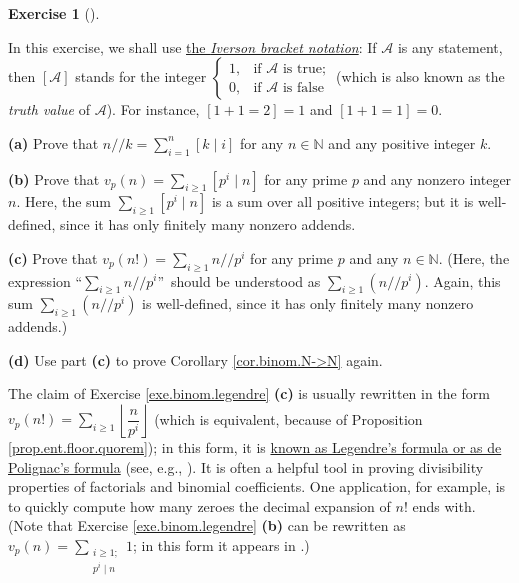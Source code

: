 \documentclass[numbers=enddot,12pt,final,onecolumn,notitlepage]{scrartcl}%
\newcounter{exer}
\numberwithin{exer}{subsection}
\theoremstyle{definition}
\newtheorem{exmp}[exer]{Exercise}
\newenvironment{exercise}[1][]
{\begin{exmp}[#1]\begin{leftbar}}
{\end{leftbar}\end{exmp}}
\let\sumnonlimits\sum
\renewcommand{\sum}{\sumnonlimits\limits}
\begin{document}
\begin{exercise}
\label{exe.binom.legendre}In this exercise, we shall use
\href{https://en.wikipedia.org/wiki/Iverson_bracket}{the \textit{Iverson
bracket notation}}: If $\mathcal{A}$ is any statement, then $\left[
\mathcal{A}\right]  $ stands for the integer $%
\begin{cases}
1, & \text{if $\mathcal{A}$ is true;}\\
0, & \text{if $\mathcal{A}$ is false}%
\end{cases}
$ (which is also known as the \textit{truth value} of $\mathcal{A}$). For
instance, $\left[  1+1=2\right]  =1$ and $\left[  1+1=1\right]  =0$.

\textbf{(a)} Prove that $n//k=\sum_{i=1}^{n}\left[  k\mid i\right]  $ for any
$n\in\mathbb{N}$ and any positive integer $k$.

\textbf{(b)} Prove that $v_{p}\left(  n\right)  =\sum_{i\geq1}\left[
p^{i}\mid n\right]  $ for any prime $p$ and any nonzero integer $n$. Here, the
sum $\sum_{i\geq1}\left[  p^{i}\mid n\right]  $ is a sum over all positive
integers; but it is well-defined, since it has only finitely many nonzero addends.

\textbf{(c)} Prove that $v_{p}\left(  n!\right)  =\sum_{i\geq1}n//p^{i}$ for
any prime $p$ and any $n\in\mathbb{N}$. (Here, the expression
\textquotedblleft$\sum_{i\geq1}n//p^{i}$\textquotedblright\ should be
understood as $\sum_{i\geq1}\left(  n//p^{i}\right)  $. Again, this sum
$\sum_{i\geq1}\left(  n//p^{i}\right)  $ is well-defined, since it has only
finitely many nonzero addends.)

\textbf{(d)} Use part \textbf{(c)} to prove Corollary \ref{cor.binom.N->N} again.
\end{exercise}

The claim of Exercise \ref{exe.binom.legendre} \textbf{(c)} is usually
rewritten in the form $v_{p}\left(  n!\right)  =\sum_{i\geq1}\left\lfloor
\dfrac{n}{p^{i}}\right\rfloor $ (which is equivalent, because of Proposition
\ref{prop.ent.floor.quorem}); in this form, it is
\href{https://en.wikipedia.org/wiki/Legendre's_formula}{known as Legendre's
formula or as de Polignac's formula} (see, e.g., \cite[Theorem 1.3.3]{floor}).
It is often a helpful tool in proving divisibility properties of factorials
and binomial coefficients. One application, for example, is to quickly compute
how many zeroes the decimal expansion of $n!$ ends with. (Note that Exercise
\ref{exe.binom.legendre} \textbf{(b)} can be rewritten as $v_{p}\left(
n\right)  =\sum_{\substack{i\geq1;\\p^{i}\mid n}}1$; in this form it appears
in \cite[Lemma 1.3.4]{floor}.)
\end{document}
